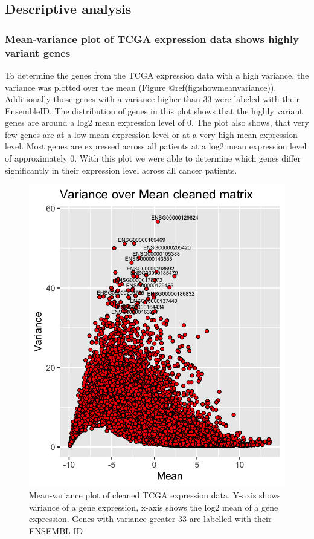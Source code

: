 \documentclass[
]{article}
\begin{document}
\hypertarget{descriptive-analysis}{%
\subsection{Descriptive analysis}\label{descriptive-analysis}}

\hypertarget{mean-variance-plot-of-tcga-expression-data-shows-highly-variant-genes}{%
\subsubsection{Mean-variance plot of TCGA expression data shows highly
variant
genes}\label{mean-variance-plot-of-tcga-expression-data-shows-highly-variant-genes}}

To determine the genes from the TCGA expression data with a high
variance, the variance was plotted over the mean (Figure
@ref(fig:showmeanvariance)). Additionally those genes with a variance
higher than 33 were labeled with their EnsembleID. The distribution of
genes in this plot shows that the highly variant genes are around a log2
mean expression level of 0. The plot also shows, that very few genes are
at a low mean expression level or at a very high mean expression level.
Most genes are expressed across all patients at a log2 mean expression
level of approximately 0. With this plot we were able to determine which
genes differ significantly in their expression level across all cancer
patients.

\begin{figure}

{\centering \includegraphics[width=0.65\linewidth]{figures/Variance_over mean_cleaned_matrix} 

}

\caption{Mean-variance plot of cleaned TCGA expression data. Y-axis shows variance of a gene expression, x-axis shows the log2 mean of a gene expression. Genes with variance greater 33 are labelled with their ENSEMBL-ID}\label{fig:showmeanvariance}
\end{figure}
\end{document}
